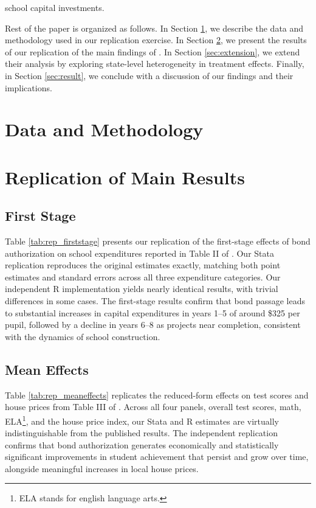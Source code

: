 \documentclass[12pt]{article}
\begin{document}
school capital investments. 

Rest of the paper is organized as follows. In Section \ref{sec:data_rep}, we describe the data and methodology used in our replication exercise. In Section \ref{sec:replication}, we present the results of our replication of the main findings of \cite{biasi_what_2025}. In Section \ref{sec:extension}, we extend their analysis by exploring state-level heterogeneity in treatment effects. Finally, in Section \ref{sec:result}, we conclude with a discussion of our findings and their implications.

\section{Data and Methodology} \label{sec:data_rep}



\section{Replication of Main Results} \label{sec:replication}

\subsection{First Stage}

Table \ref{tab:rep_firststage} presents our replication of the first-stage effects of bond authorization on school expenditures reported in Table II of \citet{biasi_what_2025}. Our Stata replication reproduces the original estimates exactly, matching both point estimates and standard errors across all three expenditure categories. Our independent R implementation yields nearly identical results, with trivial differences in some cases. The first-stage results confirm that bond passage leads to substantial increases in capital expenditures in years 1--5 of around \$325 per pupil, followed by a decline in years 6--8 as projects near completion, consistent with the dynamics of school construction.



\subsection{Mean Effects}

Table \ref{tab:rep_meaneffects} replicates the reduced-form effects on test scores and house prices from Table III of \citet{biasi_what_2025}. Across all four panels, overall test scores, math, ELA\footnote{ELA stands for english language arts.}, and the house price index, our Stata and R estimates are virtually indistinguishable from the published results. The independent replication confirms that bond authorization generates economically and statistically significant improvements in student achievement that persist and grow over time, alongside meaningful increases in local house prices. 
\end{document}
